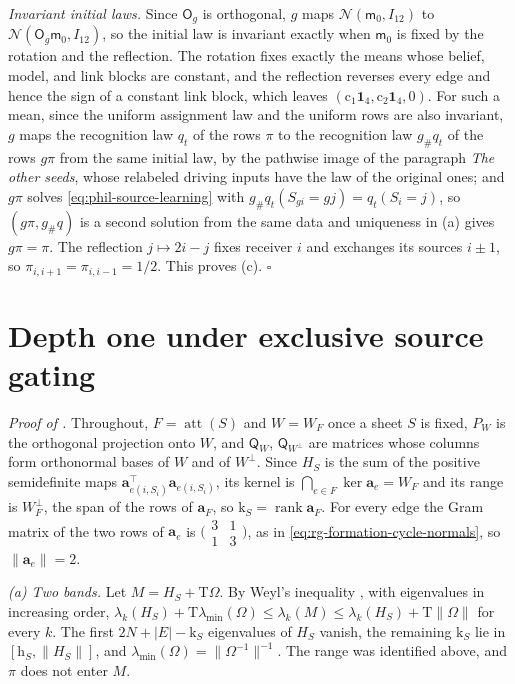 \emph{Invariant initial laws.} Since \(\mathsf O_g\) is orthogonal, \(g\) maps
\(\mathcal N(\mathsf m_0,I_{12})\) to \(\mathcal N(\mathsf O_g\mathsf m_0,I_{12})\),
so the initial law is invariant exactly when \(\mathsf m_0\) is fixed by the
rotation and the reflection. The rotation fixes exactly the means whose belief,
model, and link blocks are constant, and the reflection reverses every edge and
hence the sign of a constant link block, which leaves
\((\mathrm c_1\mathbf 1_4,\mathrm c_2\mathbf 1_4,0)\). For such a mean, since
the uniform assignment law and the uniform rows are also invariant, \(g\) maps
the recognition law \(q_t\) of the rows \(\pi\) to the recognition law
\(g_\#q_t\) of the rows \(g\pi\) from the same initial law, by the pathwise
image of the paragraph \emph{The other seeds}, whose relabeled driving inputs
have the law of the original ones; and \(g\pi\) solves
\cref{eq:phil-source-learning} with \(g_\#q_t(S_{gi}=gj)=q_t(S_i=j)\), so
\((g\pi,g_\#q)\) is a second solution from the same data and uniqueness in (a)
gives \(g\pi=\pi\). The reflection \(j\mapsto2i-j\) fixes receiver \(i\) and
exchanges its sources \(i\pm1\), so \(\pi_{i,i+1}=\pi_{i,i-1}=1/2\). This
proves (c). \(\square\)

\section{Depth one under exclusive source gating}
\label{sec:rg-formation-depth-one-proof}

\noindent\emph{Proof of .}
Throughout, \(F=\operatorname{att}(S)\) and \(W=W_F\) once a sheet \(S\) is
fixed, \(P_W\) is the orthogonal projection onto \(W\), and
\(\mathsf Q_W\), \(\mathsf Q_{W^\perp}\) are matrices whose columns form
orthonormal bases of \(W\) and of \(W^\perp\). Since \(H_S\) is the sum of the
positive semidefinite maps \(\mathbf a_{e(i,S_i)}^\top\mathbf a_{e(i,S_i)}\),
its kernel is \(\bigcap_{e\in F}\ker\mathbf a_e=W_F\) and its range is
\(W_F^\perp\), the span of the rows of \(\mathbf a_F\), so
\(\mathrm k_S=\operatorname{rank}\mathbf a_F\). For every edge the Gram
matrix of the two rows of \(\mathbf a_e\) is
\(\bigl(\begin{smallmatrix}3&1\\1&3\end{smallmatrix}\bigr)\), as in
\cref{eq:rg-formation-cycle-normals}, so \(\|\mathbf a_e\|=2\).

\emph{(a) Two bands.} Let \(M=H_S+\mathrm T\Omega\). By Weyl's inequality
\citep[Sec.~4.3]{HornJohnson2013}, with eigenvalues in increasing order,
\(\lambda_k(H_S)+\mathrm T\lambda_{\min}(\Omega)\le\lambda_k(M)
\le\lambda_k(H_S)+\mathrm T\|\Omega\|\) for every \(k\). The first
\(2N+|E|-\mathrm k_S\) eigenvalues of \(H_S\) vanish, the remaining
\(\mathrm k_S\) lie in \([\mathrm h_S,\|H_S\|]\), and
\(\lambda_{\min}(\Omega)=\|\Omega^{-1}\|^{-1}\). The range was identified
above, and \(\pi\) does not enter \(M\).

